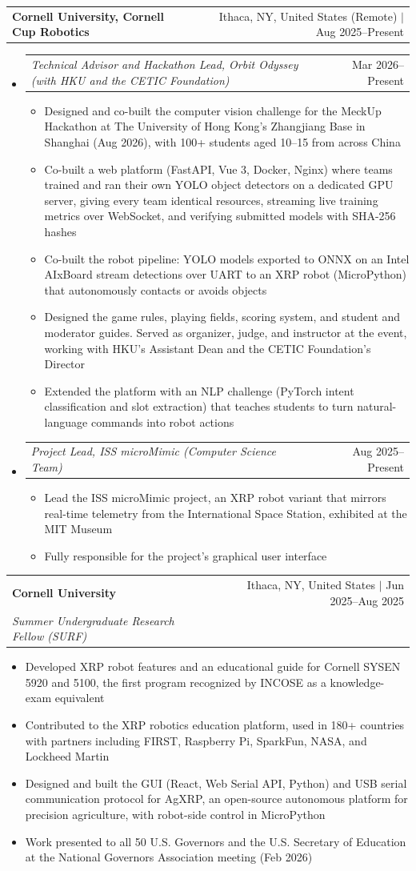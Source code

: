 \documentclass[letterpaper,11pt]{article}
\makeatletter
\newcommand{\resumeItem}[1]{\item\small{#1\vspace{-2pt}}}
\newcommand{\resumeOrg}[2]{
  \item
  \begin{tabular*}{0.97\textwidth}[t]{l@{\extracolsep{\fill}}r}
    \textbf{#1} & #2 \\
  \end{tabular*}\vspace{-7pt}
}
\newcommand{\resumeRole}[2]{
  \item
  \begin{tabular*}{0.97\textwidth}[t]{l@{\extracolsep{\fill}}r}
    \textit{\small#1} & {\small #2} \\
  \end{tabular*}\vspace{-7pt}
}
\newcommand{\resumeSubheading}[3]{
  \vspace{-2pt}\item
  \begin{tabular*}{0.97\textwidth}[t]{l@{\extracolsep{\fill}}r}
    \textbf{#1} & #2 \\
    \textit{\small#3} & \\
  \end{tabular*}\vspace{-7pt}
}
\newcommand{\resumeRoleListStart}{\begin{itemize}[leftmargin=0.15in, label={}]}
\newcommand{\resumeRoleListEnd}{\end{itemize}}
\newcommand{\resumeItemListStart}{\begin{itemize}[leftmargin=0.15in, itemsep=0pt]}
\newcommand{\resumeItemListEnd}{\end{itemize}\vspace{-5pt}}
\makeatother
\begin{document}
  \resumeOrg{Cornell University, Cornell Cup Robotics}{Ithaca, NY, United States (Remote) $|$ Aug 2025--Present}
  \resumeRoleListStart

    \resumeRole{Technical Advisor and Hackathon Lead, Orbit Odyssey (with HKU and the CETIC Foundation)}{Mar 2026--Present}
    \resumeItemListStart
      \resumeItem{Designed and co-built the computer vision challenge for the MeckUp Hackathon at The University of Hong Kong's Zhangjiang Base in Shanghai (Aug 2026), with 100+ students aged 10--15 from across China}
      \resumeItem{Co-built a web platform (FastAPI, Vue 3, Docker, Nginx) where teams trained and ran their own YOLO object detectors on a dedicated GPU server, giving every team identical resources, streaming live training metrics over WebSocket, and verifying submitted models with SHA-256 hashes}
      \resumeItem{Co-built the robot pipeline: YOLO models exported to ONNX on an Intel AIxBoard stream detections over UART to an XRP robot (MicroPython) that autonomously contacts or avoids objects}
      \resumeItem{Designed the game rules, playing fields, scoring system, and student and moderator guides. Served as organizer, judge, and instructor at the event, working with HKU's Assistant Dean and the CETIC Foundation's Director}
      \resumeItem{Extended the platform with an NLP challenge (PyTorch intent classification and slot extraction) that teaches students to turn natural-language commands into robot actions}
    \resumeItemListEnd

    \resumeRole{Project Lead, ISS microMimic (Computer Science Team)}{Aug 2025--Present}
    \resumeItemListStart
      \resumeItem{Lead the ISS microMimic project, an XRP robot variant that mirrors real-time telemetry from the International Space Station, exhibited at the MIT Museum}
      \resumeItem{Fully responsible for the project's graphical user interface}
    \resumeItemListEnd

  \resumeRoleListEnd

  \resumeSubheading
    {Cornell University}{Ithaca, NY, United States $|$ Jun 2025--Aug 2025}
    {Summer Undergraduate Research Fellow (SURF)}
  \resumeItemListStart
    \resumeItem{Developed XRP robot features and an educational guide for Cornell SYSEN 5920 and 5100, the first program recognized by INCOSE as a knowledge-exam equivalent}
    \resumeItem{Contributed to the XRP robotics education platform, used in 180+ countries with partners including FIRST, Raspberry Pi, SparkFun, NASA, and Lockheed Martin}
    \resumeItem{Designed and built the GUI (React, Web Serial API, Python) and USB serial communication protocol for AgXRP, an open-source autonomous platform for precision agriculture, with robot-side control in MicroPython}
    \resumeItem{Work presented to all 50 U.S. Governors and the U.S. Secretary of Education at the National Governors Association meeting (Feb 2026)}
  \resumeItemListEnd
\end{document}
